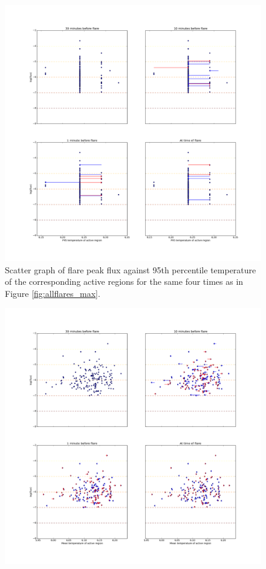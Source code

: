 \documentclass[referee,a4paper,12pt]{swsc}
\begin{document}
\begin{linenumbers}
\begin{figure}
		\includegraphics[width=0.9\columnwidth]{tempplots_p95/allflares.png}
	\caption{Scatter graph of flare peak flux against 95th percentile temperature of the corresponding active regions for the same four times as in Figure \ref{fig:allflares_max}.}
	\label{fig:allflares_p95}
\end{figure}
\begin{figure}
	\centering
		\includegraphics[width=0.9\columnwidth]{tempplotsmean/allflares.png}

\end{figure}
\end{linenumbers}
\end{document}
